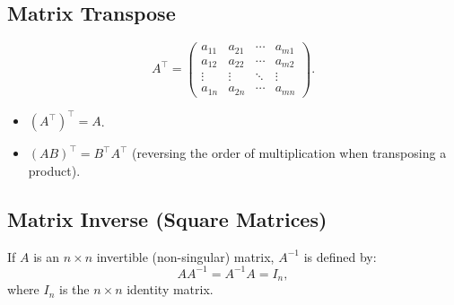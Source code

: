 \subsection{Matrix Transpose}
\[
A^\top =
\begin{pmatrix}
a_{11} & a_{21} & \cdots & a_{m1} \\
a_{12} & a_{22} & \cdots & a_{m2} \\
\vdots & \vdots & \ddots & \vdots \\
a_{1n} & a_{2n} & \cdots & a_{mn}
\end{pmatrix}.
\]
\begin{itemize}
\item $(A^\top)^\top = A$.
\item $(AB)^\top = B^\top A^\top$ (reversing the order of multiplication when transposing a product).
\end{itemize}

\subsection{Matrix Inverse (Square Matrices)}
If $A$ is an $n \times n$ invertible (non-singular) matrix, $A^{-1}$ is defined by:
\[
A A^{-1} = A^{-1} A = I_n,
\]
where $I_n$ is the $n \times n$ identity matrix.

